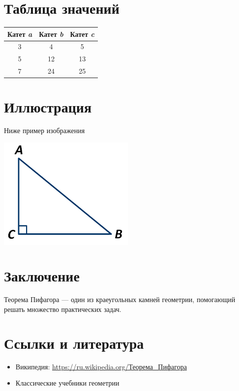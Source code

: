 \documentclass{article}
\begin{document}
\section{Таблица значений}
\begin{center}
\begin{tabular}{|c|c|c|}
\hline
Катет \textit{a} & Катет \textit{b} & Катет \textit{c} \\
\hline
3 & 4 & 5 \\
\hline
5 & 12 & 13 \\
\hline
7 & 24 & 25 \\
\hline
\end{tabular}
\end{center}
\section{Иллюстрация}
\item Ниже пример изображения
\begin{center}
    \includegraphics[width=0.5\textwidth]{triangle.png}
\end{center}
\section{Заключение}

\item Теорема Пифагора — один из краеугольных камней геометрии, помогающий решать множество практических задач.
\section{Ссылки и литература}
\begin{itemize}
    \item Википедия: \url{https://ru.wikipedia.org/Теорема_Пифагора}
    \item Классические учебники геометрии
\end{itemize}
\newpage{}
\end{document}
